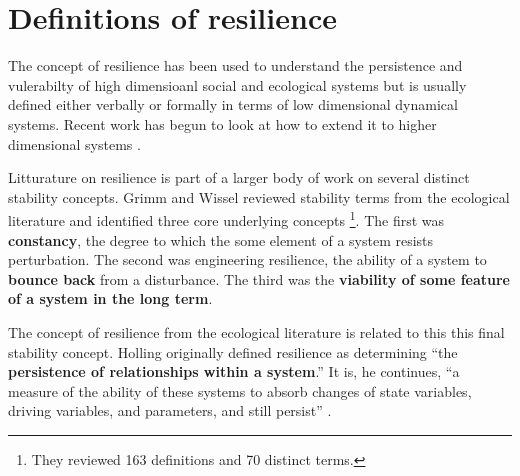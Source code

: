 \section{Definitions of resilience}

The concept of resilience has been used to understand the persistence and vulerabilty of high dimensioanl social and ecological systems %
but is usually defined either verbally or formally in terms of low dimensional dynamical systems. Recent work has begun to look at how to extend it to higher dimensional systems \cite{gao_universal_2016}. 

Litturature on resilience is part of a larger body of work on several distinct stability concepts. 
Grimm and Wissel reviewed stability terms from the ecological literature \cite{grimm_what_2011, grimm_babel_1997} and identified three core underlying concepts \footnote{They reviewed 163 definitions and 70 distinct terms.}. The first was \textbf{constancy}, the degree to which the some element of a system resists perturbation. The second was engineering resilience, the ability of a system to \textbf{bounce back} from a disturbance.  The third was the \textbf{viability of some feature of a system in the long term}. %

The concept of resilience from the ecological literature is related to this this final stability concept. Holling originally defined resilience as determining ``the \textbf{persistence of relationships within a system}.'' It is, he continues, ``a measure of the ability of these systems to absorb changes of state variables, driving variables, and parameters, and still persist” \cite{holling_resilience_1973}. %



